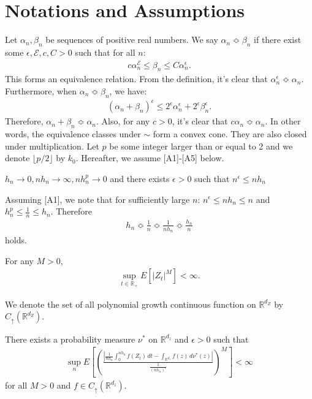 \documentclass[a4paper,11pt]{jsarticle}
\begin{document}
\section{Notations and Assumptions}
Let $\alpha_n, \beta_n$ be sequences of positive real numbers. We say $\alpha_n \Bumpeq	 \beta_n$ if there exist some $\epsilon, \mathcal{E}, c, C > 0$ such that for all $n$:
\begin{align}
c\alpha_n^{\mathcal{E}} \leq \beta_n \leq C\alpha_n^\epsilon.
\end{align}
This forms an equivalence relation. From the definition, it's clear that $\alpha_n^\epsilon \Bumpeq	 \alpha_n$. Furthermore, when $\alpha_n \Bumpeq \beta_n$, we have:
\begin{align}
(\alpha_n + \beta_n)^\epsilon \leq 2^\epsilon \alpha_n^\epsilon + 2^\epsilon \beta_n^\epsilon.
\end{align}
Therefore, $\alpha_n + \beta_n\Bumpeq	 \alpha_n$. Also, for any $c > 0$, it's clear that $c\alpha_n \Bumpeq	 \alpha_n$. In other words, the equivalence classes under $\sim$ form a convex cone. They are also closed under multiplication. 
Let $ p$ be some integer larger than or equal to 2 and we denote $\lfloor p/2 \rfloor $ by $k_0$.
Hereafter, we assume [A1]-[A5] below. 
   \begin{enumerate}[label = {[{A\arabic*}]},ref=  {[{A\arabic*}]}]
    \item    $h_n \to 0,nh_n \to \infty,nh_n^p \to 0$ and there exists $\epsilon>0$ such that $n^\epsilon \leq nh_n$
\end{enumerate}
Assuming [A1], we note that for sufficiently large $n$:
$n^\epsilon \leq nh_n \leq n$ and $h_n^p \leq \frac{1}{n} \leq h_n$. Therefore
\begin{align}
h_n \Bumpeq	 \frac{1}{n}\Bumpeq	\frac{1}{nh_n}\Bumpeq	\frac{h_n}{n}
\end{align}
holds.

    \begin{enumerate}[label = {[{A\arabic*}]},ref=  {[{A\arabic*}]}]\setcounter{enumi}{1}
    \item  For any $M >0$,\begin{align}
      \sup_{t \in \mathbb{R}_+ } E[|Z_t|^M ]< \infty.
  \end{align}
\end{enumerate}
We denote the set of all polynomial growth continuous function on $\mathbb{R}^{d_Z} $ by $C_\uparrow(\mathbb{R}^{d_Z}) $.
    \begin{enumerate}[label = {[{A\arabic*}]},ref=  {[{A\arabic*}]}]\setcounter{enumi}{2}
    \item There exists a probability measure $\nu^*$ on $\mathbb{R}^{d_z} $ and $\epsilon >0$ such that \begin{align}
\sup_n     E\left[\left(\frac{\left| \frac{1}{nh_n}\int_0^{nh_n} f(Z_t) \,dt - \int_{\mathbb{R}^{d_z} } f(z) \,d\nu^*(z)\right| }{\frac{1}{(nh_n)^\epsilon }} \right)^M  \right]< \infty
\end{align}
for all $M>0$ and $f \in C_\uparrow(\mathbb{R}^{d_z}) $.
\end{enumerate}
\end{document}
